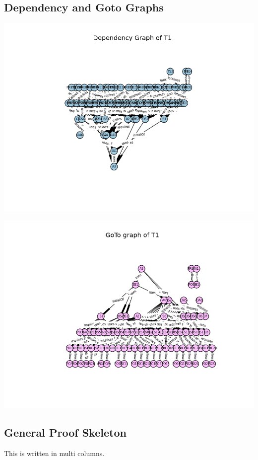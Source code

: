 \subsection{Dependency and Goto Graphs}
\label{app:sb2.5}
\noindent \includegraphics[scale=0.5]{examples/steamboiler/25a.png}

\noindent \includegraphics[scale=0.5]{examples/steamboiler/25b.png}

\subsection{General Proof Skeleton}
\label{app:sb3}
This is written in multi columns. 
\begin{multicols}{2}
\end{multicols}

